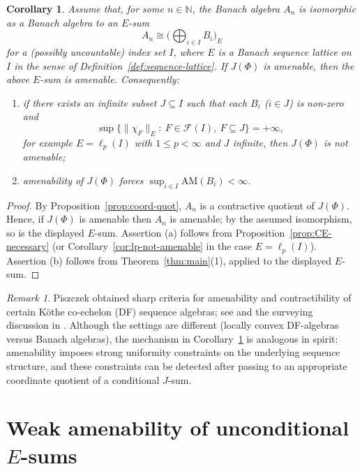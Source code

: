\documentclass[reqno]{amsart}
\theoremstyle{plain}
\newtheorem{corollary}[theorem]{Corollary}
\theoremstyle{definition}
\theoremstyle{remark}
\newtheorem{remark}[theorem]{Remark}
\newcommand{\cF}{\mathcal{F}}
\newcommand{\N}{\mathbb{N}}
\renewcommand{\le}{\leqslant}
\begin{document}
\begin{corollary}\label{cor:Esum-detected}
Assume that, for some $n\in\N$, the Banach algebra $A_n$ is isomorphic as a Banach algebra to an
$E$-sum
\[
A_n \cong \Big(\bigoplus_{i\in I} B_i\Big)_{E}
\]
for a (possibly uncountable) index set $I$, where $E$ is a Banach sequence lattice
on~$I$ in the sense of Definition~\ref{def:sequence-lattice}.  If $J(\Phi)$ is amenable, then the above
$E$-sum is amenable.  Consequently:
\begin{enumerate}[label={\rm(\alph*)}]
\item if there exists an infinite subset $J\subseteq I$ such that each $B_i$ ($i\in J$) is
      non-zero and
      \[
      \sup\bigl\{\|\chi_F\|_E:\ F\in\cF(I),\ F\subseteq J\bigr\}=+\infty,
      \]
      for example $E=\ell_p(I)$ with $1\le p<\infty$ and $J$ infinite, then $J(\Phi)$ is not amenable;
\item amenability of $J(\Phi)$ forces
      $\sup_{i\in I}\mathrm{AM}(B_i)<\infty$.
\end{enumerate}
\end{corollary}

\begin{proof}
By Proposition~\ref{prop:coord-quot}, $A_n$ is a contractive quotient of
$J(\Phi)$.  Hence, if $J(\Phi)$ is amenable then $A_n$ is amenable; by the assumed
isomorphism, so is the displayed $E$-sum.  Assertion (a) follows from
Proposition~\ref{prop:CE-necessary} (or Corollary~\ref{cor:lp-not-amenable} in the
case $E=\ell_p(I)$).  Assertion (b) follows from Theorem~\ref{thm:main}(1), applied
to the displayed $E$-sum.
\end{proof}

\begin{remark}\label{rem:Piszczek}
Piszczek obtained sharp criteria for amenability and contractibility of certain
K\"othe co-echelon (DF) sequence algebras; see \cite{Piszczek2019} and the
surveying discussion in \cite{PirkovskiiPiszczek2022}.  Although the settings are
different (locally convex DF-algebras versus Banach algebras), the mechanism in
Corollary~\ref{cor:Esum-detected} is analogous in spirit: amenability imposes strong
uniformity constraints on the underlying sequence structure, and these constraints
can be detected after passing to an appropriate coordinate quotient of a conditional
$J$-sum.
\end{remark}

\section{Weak amenability of unconditional $E$-sums}\label{sec:weak-amenability}
\end{document}
